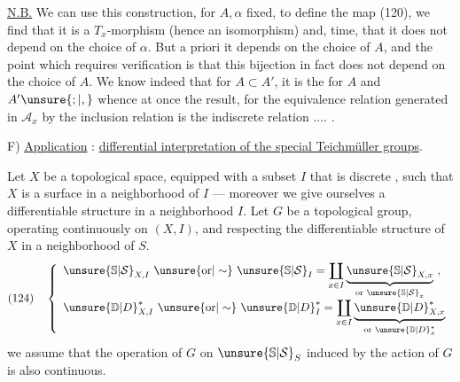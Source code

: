 \uline{N.B.} We can use this construction, for $A,\alpha$ fixed,
to define the map (120), we find that it is a
$T_x$-morphism (hence an isomorphism) and,
time, that it does not depend on the choice of $\alpha$.
But a priori it depends  on the choice of $A$, and the point which
requires verification is that this bijection in fact does not depend on the choice
of $A$. We know indeed that for $A\subset A'$, it is the
 for $A$ and $A'\unsure{;|,}$
whence at once the result, for the equivalence relation generated in
$\mathcal{A}_x$ by the inclusion relation is the indiscrete relation .... .




F) \uline{Application} : \uline{differential interpretation of the special
Teichmüller groups}.

Let $X$ be a topological space, equipped with a subset $I$ that is discrete
, such that $X$ is a surface in a neighborhood of $I$ ---
moreover we give ourselves a differentiable structure 
in a neighborhood  $I$. Let $G$  be a
topological group, operating continuously on $(X,I)$, and respecting the
differentiable structure of $X$ in a neighborhood of $S$. 
\[
(124)\quad\left\{\begin{array}{l}
\unsure{\mathbb{S}|\mathcal{S}}_{X,I}\ \unsure{\text{or}|\sim}\ \unsure{\mathbb{S}|\mathcal{S}}_I
=\displaystyle\coprod_{x\in I}
\underbrace{\unsure{\mathbb{S}|\mathcal{S}}_{X,x}}_{\text{or }\unsure{\mathbb{S}|\mathcal{S}}_x}\ ,\\[8pt]
\unsure{\mathbb{D}|D}_{X,I}^{*}\ \unsure{\text{or}|\sim}\ \unsure{\mathbb{D}|D}_{I}^{*}
=\displaystyle\coprod_{x\in I}
\underbrace{\unsure{\mathbb{D}|D}_{X,x}^{*}}_{\text{or }\unsure{\mathbb{D}|D}_x^{*}}
\end{array}\right.
\]
we assume that the operation of $G$ on $\unsure{\mathbb{S}|\mathcal{S}}_S$ induced by
the action of $G$ is also continuous.

